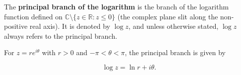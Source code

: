 The \textbf{principal branch of the logarithm} is the branch of the logarithm function defined on $\mathbb{C} \setminus \{z \in \mathbb{R} : z \leq 0\}$ (the complex plane slit along the non-positive real axis). It is denoted by $\log z$, and unless otherwise stated, $\log z$ always refers to the principal branch.

For $z = re^{i\theta}$ with $r > 0$ and $-\pi < \theta < \pi$, the principal branch is given by

$$\log z = \ln r + i\theta.$$
